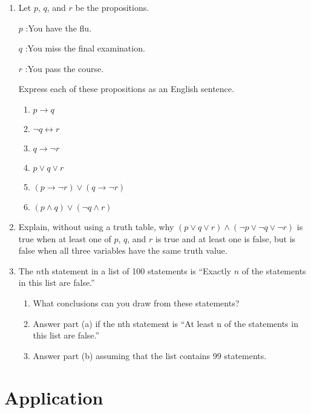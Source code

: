 \documentclass{sig-alternate-05-2015}
\begin{document}
\begin{enumerate}
\item Let $p$, $q$, and $r$ be the propositions.

$p$ :You have the flu.

$q$ :You miss the final examination.

$r$ :You pass the course.

Express each of these propositions as an English sentence.

\begin{enumerate}
	\item $p\rightarrow q$
	\item $\neg q \leftrightarrow r$
	\item $q \rightarrow \neg r$
	\item $p \vee q \vee r$
	\item $(p \rightarrow \neg r ) \vee (q \rightarrow \neg r)$
	\item $(p\wedge q)\vee (\neg q \wedge r)$
\end{enumerate}

\item Explain, without using a truth table, why $(p \vee q \vee r) \wedge
(\neg p \vee \neg q \vee \neg r)$ is true when at least one of $p$, $q$, and $r$
is true and at least one is false, but is false when all three
variables have the same truth value.

\item The $n$th statement in a list of 100 statements is \textquotedblleft Exactly
$n$ of the statements in this list are false.\textquotedblright
\begin{enumerate}
	\item What conclusions can you draw from these statements?
	\item Answer part (a) if the nth statement is \textquotedblleft At least n of
	the statements in this list are false.\textquotedblright
	\item Answer part (b) assuming that the list contains 99
	statements.
\end{enumerate}

\end{enumerate}

\section{Application}
\end{document}
